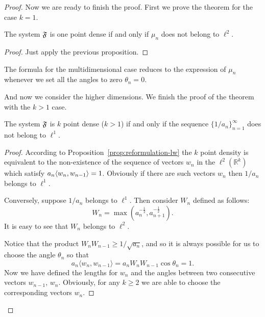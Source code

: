 \begin{proof}
    Now we are ready to finish the proof.
    First we prove the theorem for the case $k=1$.
    \begin{prop}
      The system $\mathfrak{F}$ is one point dense if and only if $\mu_n$ does not belong to $\ell^2$.
    \end{prop}
    \begin{proof}
      Just apply the previous proposition.
    \end{proof}

    The formula for the multidimensional case reduces to the expression of $\mu_n$ whenever we
      set all the angles to zero $\theta_n = 0$.

    And now we consider the higher dimensions.
    We finish the proof of the theorem with the $k > 1$ case.
    \begin{prop}
      The system $\mathfrak{F}$ is $k$ point dense ($k > 1$) if and only if the sequence $\{1/a_n\}_{n=1}^\infty$ does not belong to $\ell^1$.
    \end{prop}
    \begin{proof}
      According to Proposition~\ref{prop:reformulation-lw} the $k$ point density is equivalent to the non-existence of
        the sequence of vectors $w_n$ in the $\ell^2(\mathbb{R}^k)$ which satisfy $a_n \langle w_n, w_{n-1} \rangle = 1$.
      Obviously if there are such vectors $w_n$ then $1/a_n$ belongs to $\ell^1$.

      Conversely, suppose $1/a_n$ belongs to $\ell^1$.
      Then consider $W_n$ defined as follows:
      \[
        W_n = \max(a_n^{-\frac{1}{2}}, a^{-\frac{1}{2}}_{n+1}).
      \]
      It is easy to see that $W_n$ belongs to $\ell^2$.

      Notice that the product $W_nW_{n-1} \geq 1/\sqrt{a_n}$, and so it is always possible for us to choose the angle $\theta_n$ so that
      \[
        a_n \langle w_n, w_{n-1} \rangle = a_n W_n W_{n-1}\cos{\theta_n} = 1.
      \]
      Now we have defined the lengths for $w_n$ and the angles between two consecutive vectors $w_{n-1}$, $w_n$.
      Obviously, for any $k \geq 2$ we are able to choose the corresponding vectors $w_n$.
    \end{proof}
  \end{proof}
